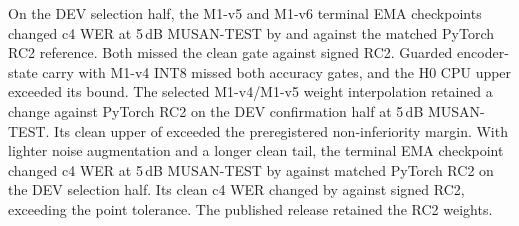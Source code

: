  On the DEV selection half, the M1-v5
and M1-v6 terminal EMA checkpoints changed c4 WER at 5\,dB MUSAN-TEST
by \WaveNoiseFiveDelta\pp{} and \WaveNoiseSixDelta\pp{} against the
matched PyTorch RC2 reference. Both missed the clean gate against signed
RC2. Guarded encoder-state carry with M1-v4 INT8 missed both accuracy
gates, and the H0 CPU upper exceeded its bound. The selected M1-v4/M1-v5
weight interpolation retained a \WaveSoupNoiseDelta\pp{} change against
PyTorch RC2 on the DEV confirmation half at 5\,dB MUSAN-TEST. Its clean
upper of \WaveSoupCleanUpper\pp{} exceeded the preregistered
\WaveSoupCleanMargin\pp{} non-inferiority margin.
With lighter noise augmentation and a longer clean tail, the terminal EMA
checkpoint changed c4 WER at 5\,dB MUSAN-TEST by \WaveLightNoiseDelta\pp{}
against matched PyTorch RC2 on the DEV selection half. Its clean c4 WER
changed by \WaveLightCleanDelta\pp{} against signed RC2, exceeding the
\WaveLightCleanMargin\pp{} point tolerance. The published release retained
the RC2 weights.
